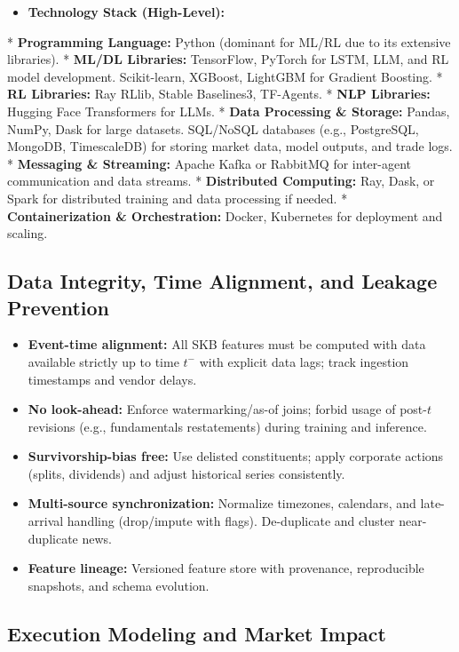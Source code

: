 \documentclass[11pt,a4paper]{article}
\begin{document}
\begin{itemize}
\item   \textbf{Technology Stack (High-Level):}
\end{itemize}
    *   \textbf{Programming Language:} Python (dominant for ML/RL due to its extensive libraries).
    *   \textbf{ML/DL Libraries:} TensorFlow, PyTorch for LSTM, LLM, and RL model development. Scikit-learn, XGBoost, LightGBM for Gradient Boosting.
    *   \textbf{RL Libraries:} Ray RLlib, Stable Baselines3, TF-Agents.
    *   \textbf{NLP Libraries:} Hugging Face Transformers for LLMs.
    *   \textbf{Data Processing \& Storage:} Pandas, NumPy, Dask for large datasets. SQL/NoSQL databases (e.g., PostgreSQL, MongoDB, TimescaleDB) for storing market data, model outputs, and trade logs.
    *   \textbf{Messaging \& Streaming:} Apache Kafka or RabbitMQ for inter-agent communication and data streams.
    *   \textbf{Distributed Computing:} Ray, Dask, or Spark for distributed training and data processing if needed.
    *   \textbf{Containerization \& Orchestration:} Docker, Kubernetes for deployment and scaling.

\subsection{Data Integrity, Time Alignment, and Leakage Prevention}

\begin{itemize}
\item   \textbf{Event-time alignment:} All SKB features must be computed with data available strictly up to time $t^{-}$ with explicit data lags; track ingestion timestamps and vendor delays.
\item   \textbf{No look-ahead:} Enforce watermarking/as-of joins; forbid usage of post-$t$ revisions (e.g., fundamentals restatements) during training and inference.
\item   \textbf{Survivorship-bias free:} Use delisted constituents; apply corporate actions (splits, dividends) and adjust historical series consistently.
\item   \textbf{Multi-source synchronization:} Normalize timezones, calendars, and late-arrival handling (drop/impute with flags). De-duplicate and cluster near-duplicate news.
\item   \textbf{Feature lineage:} Versioned feature store with provenance, reproducible snapshots, and schema evolution.

\end{itemize}
\subsection{Execution Modeling and Market Impact}
\end{document}
